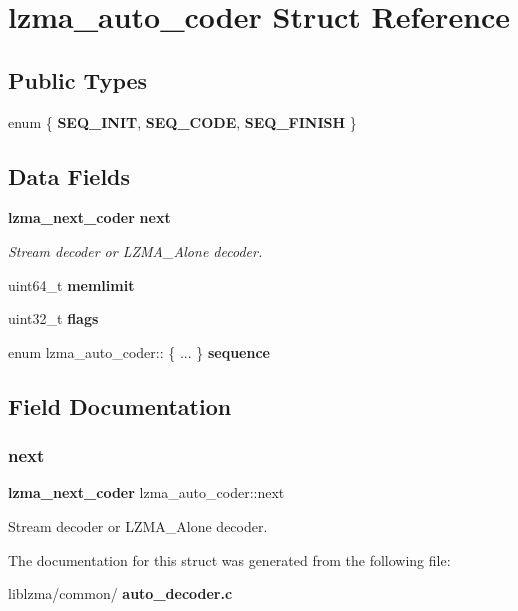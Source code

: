 \section{lzma\+\_\+auto\+\_\+coder Struct Reference}
\label{structlzma__auto__coder}
\subsection*{Public Types}
\begin{DoxyCompactItemize}
\item 
\mbox{\label{structlzma__auto__coder_a1495a2937ecdaf0e3771aa0c21f2ebe2}} 
enum \{ {\bfseries S\+E\+Q\+\_\+\+I\+N\+IT}, 
{\bfseries S\+E\+Q\+\_\+\+C\+O\+DE}, 
{\bfseries S\+E\+Q\+\_\+\+F\+I\+N\+I\+SH}
 \}
\end{DoxyCompactItemize}
\subsection*{Data Fields}
\begin{DoxyCompactItemize}
\item 
\textbf{ lzma\+\_\+next\+\_\+coder} \textbf{ next}
\begin{DoxyCompactList}\small\item\em Stream decoder or L\+Z\+M\+A\+\_\+\+Alone decoder. \end{DoxyCompactList}\item 
\mbox{\label{structlzma__auto__coder_ae82eb98fc80268ca095f387d3f37da95}} 
uint64\+\_\+t {\bfseries memlimit}
\item 
\mbox{\label{structlzma__auto__coder_a11a9d183b30aeba78045bdced4a5b8df}} 
uint32\+\_\+t {\bfseries flags}
\item 
\mbox{\label{structlzma__auto__coder_ac6d317a314526f5892c3a599d47af1ad}} 
enum lzma\+\_\+auto\+\_\+coder\+:: \{ ... \}  {\bfseries sequence}
\end{DoxyCompactItemize}


\subsection{Field Documentation}
\mbox{\label{structlzma__auto__coder_a6970b06f0b6d16a91a751d133a67591f}} 
\subsubsection{next}
{\footnotesize\ttfamily \textbf{ lzma\+\_\+next\+\_\+coder} lzma\+\_\+auto\+\_\+coder\+::next}



Stream decoder or L\+Z\+M\+A\+\_\+\+Alone decoder. 



The documentation for this struct was generated from the following file\+:\begin{DoxyCompactItemize}
\item 
liblzma/common/\textbf{ auto\+\_\+decoder.\+c}\end{DoxyCompactItemize}
